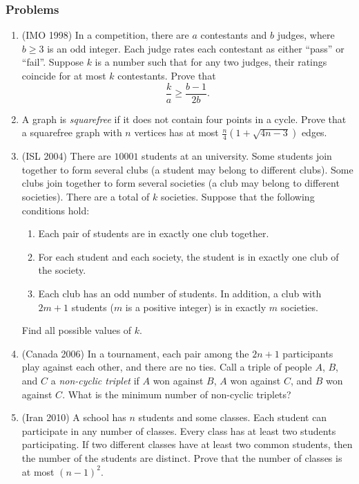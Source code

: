 \documentclass[11pt,paper=letter]{scrartcl}
\begin{document}
\subsubsection*{Problems}

\begin{enumerate}

\item (IMO 1998) In a competition, there are $a$ contestants and $b$ judges, where $b \ge 3$ is an odd integer. Each judge rates each contestant as either ``pass'' or ``fail''. Suppose $k$ is a number such that for any two judges, their ratings coincide for at most $k$ contestants. Prove that \[
  \frac{k}{a} \ge \frac{b-1}{2b}.
\] \hints{\ref{h:1} \ref{h:2}}

\item A graph is \textit{squarefree} if it does not contain four points in a cycle. Prove that a squarefree graph with $n$ vertices has at most $\frac{n}{4}\left(1 + \sqrt{4n - 3}\right)$ edges. \hints{\ref{h:3} \ref{h:4}}

\item (ISL 2004) There are $10001$ students at an university. Some students join together to form several clubs (a student may belong to different clubs). Some clubs join together to form several societies (a club may belong to different societies). There are a total of $k$ societies. Suppose that the following conditions hold:
\begin{enumerate}
  \item Each pair of students are in exactly one club together.
  \item For each student and each society, the student is in exactly one club of the society.
  \item Each club has an odd number of students. In addition, a club with $2m+1$ students ($m$ is a positive integer) is
in exactly $m$ societies.
\end{enumerate}
Find all possible values of $k$. \hints{\ref{h:7} \ref{h:8}}

\item (Canada 2006) In a tournament, each pair among the $2n + 1$ participants play against each other, and there are no ties. Call a triple of people $A$, $B$, and $C$ a \textit{non-cyclic triplet} if $A$ won against $B$, $A$ won against $C$, and $B$ won against $C$. What is the minimum number of non-cyclic triplets?  \hint{\ref{h:9}}

\item (Iran 2010) A school has $n$ students and some classes. Each student can participate in any number of classes. Every class has at least two students participating. If two different classes have at least two common students, then the number of the students are distinct. Prove that the number of classes is at most $\left(n-1\right)^2$.  \hint{\ref{h:10}}


\end{enumerate}
\end{document}
